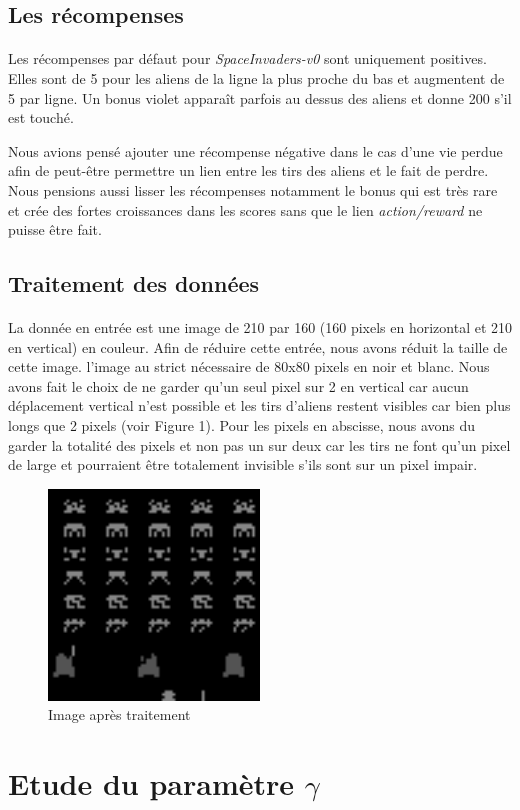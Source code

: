 \documentclass[12pt,oneside,a4paper]{article}
\begin{document}
\subsection{Les récompenses}
\paragraph{}
Les récompenses par défaut pour {\it{SpaceInvaders-v0}} sont uniquement positives.
Elles sont de 5 pour les aliens de la ligne la plus proche du bas et augmentent de 5 par ligne.
Un bonus violet apparaît parfois au dessus des aliens et donne 200 s'il est touché.

Nous avions pensé ajouter une récompense négative dans le cas d'une vie perdue afin de peut-être
permettre un lien entre les tirs des aliens et le fait de perdre. Nous pensions aussi lisser les
récompenses notamment le bonus qui est très rare et crée des fortes croissances dans les scores sans que
le lien {\it{action/reward}} ne puisse être fait.

\newpage
\subsection{Traitement des données}
\paragraph{}
La donnée en entrée est une image de 210 par 160 (160 pixels en horizontal et 210 en vertical)
en couleur. Afin de réduire cette entrée, nous avons réduit la taille de cette image.
l'image au strict nécessaire de 80x80 pixels en noir et blanc. Nous avons fait le choix
de ne garder qu'un seul pixel sur 2 en vertical car aucun déplacement vertical n'est possible et 
les tirs d'aliens restent visibles car bien plus longs que 2 pixels (voir Figure 1). Pour les pixels en abscisse,
nous avons du garder la totalité des pixels et non pas un sur deux car les tirs 
ne font qu'un pixel de large et pourraient être totalement invisible s'ils sont sur un pixel impair.

\begin{figure}[h]
    \centering
    \includegraphics[width=0.5\textwidth] {./processed_image.png}
    \caption{Image après traitement}
\end{figure}

\section{Etude du paramètre $\gamma$}
\end{document}
